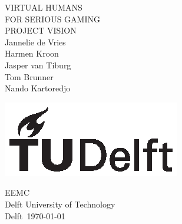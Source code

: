 \documentclass[]{article}
\begin{document}
	
	\begin{titlepage}
		\centering
		
		{\Huge VIRTUAL HUMANS}\\[1em]
		{\huge FOR SERIOUS GAMING}\\[1em]
		{\Large PROJECT VISION}\\[2em]
		{Jannelie de Vries}\\
		{Harmen Kroon}\\
		{Jasper van Tiburg}\\
		{Tom Brunner}\\
		{Nando Kartoredjo}
		
		\vfill
		
		\includegraphics{TU_Delft_logo_Black.eps}
		
		EEMC\\
		Delft University of Technology\\
		Delft\
		\today		
	\end{titlepage}
	
	\tableofcontents
	\newpage
	
	
	
	
	
	

	
\end{document}
